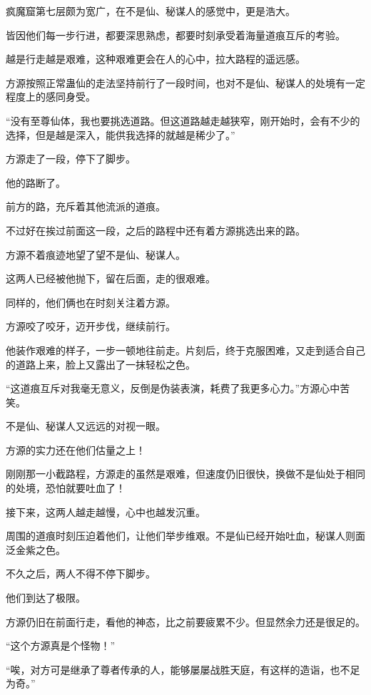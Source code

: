 
\begin{this_body}

疯魔窟第七层颇为宽广，在不是仙、秘谋人的感觉中，更是浩大。

皆因他们每一步行进，都要深思熟虑，都要时刻承受着海量道痕互斥的考验。

越是行走越是艰难，这种艰难更会在人的心中，拉大路程的遥远感。

方源按照正常蛊仙的走法坚持前行了一段时间，也对不是仙、秘谋人的处境有一定程度上的感同身受。

“没有至尊仙体，我也要挑选道路。但这道路越走越狭窄，刚开始时，会有不少的选择，但是越是深入，能供我选择的就越是稀少了。”

方源走了一段，停下了脚步。

他的路断了。

前方的路，充斥着其他流派的道痕。

不过好在挨过前面这一段，之后的路程中还有着方源挑选出来的路。

方源不着痕迹地望了望不是仙、秘谋人。

这两人已经被他抛下，留在后面，走的很艰难。

同样的，他们俩也在时刻关注着方源。

方源咬了咬牙，迈开步伐，继续前行。

他装作艰难的样子，一步一顿地往前走。片刻后，终于克服困难，又走到适合自己的道路上来，脸上又露出了一抹轻松之色。

“这道痕互斥对我毫无意义，反倒是伪装表演，耗费了我更多心力。”方源心中苦笑。

不是仙、秘谋人又远远的对视一眼。

方源的实力还在他们估量之上！

刚刚那一小截路程，方源走的虽然是艰难，但速度仍旧很快，换做不是仙处于相同的处境，恐怕就要吐血了！

接下来，这两人越走越慢，心中也越发沉重。

周围的道痕时刻压迫着他们，让他们举步维艰。不是仙已经开始吐血，秘谋人则面泛金紫之色。

不久之后，两人不得不停下脚步。

他们到达了极限。

方源仍旧在前面行走，看他的神态，比之前要疲累不少。但显然余力还是很足的。

“这个方源真是个怪物！”

“唉，对方可是继承了尊者传承的人，能够屡屡战胜天庭，有这样的造诣，也不足为奇。”


\end{this_body}
